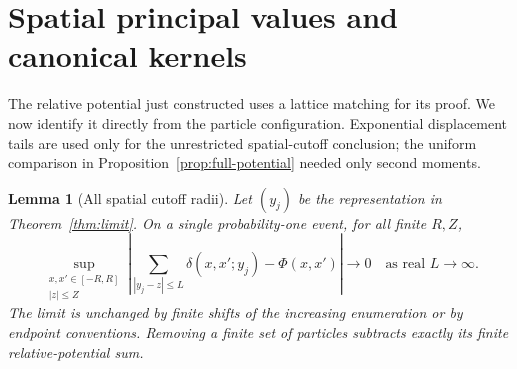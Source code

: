 \documentclass[11pt]{article}
\newtheorem{lemma}[theorem]{Lemma}
\theoremstyle{remark}\newtheorem{remark}[theorem]{Remark}
\begin{document}
\section{Spatial principal values and canonical kernels}\label{sec:intrinsic}

The relative potential just constructed uses a lattice matching
for its proof. We now identify it directly from the particle
configuration. Exponential displacement tails are used only for
the unrestricted spatial-cutoff conclusion; the uniform comparison
in Proposition~\ref{prop:full-potential} needed only second moments.

\begin{lemma}[All spatial cutoff radii]\label{lem:spatial-pv}
Let $(y_j)$ be the representation in Theorem~\ref{thm:limit}.
On a single probability-one event, for all finite $R,Z$,
\begin{equation}\label{eq:spatial-pv}
 \sup_{\substack{x,x'\in[-R,R]\\|z|\le Z}}
 \left|\sum_{|y_j-z|\le L}\delta(x,x';y_j)-\Phi(x,x')\right|
     \longrightarrow0
 \quad\text{as real }L\to\infty.
\end{equation}
The limit is unchanged by finite shifts of the increasing
enumeration or by endpoint conventions. Removing a finite set of
particles subtracts exactly its finite relative-potential sum.
\end{lemma}
\end{document}
